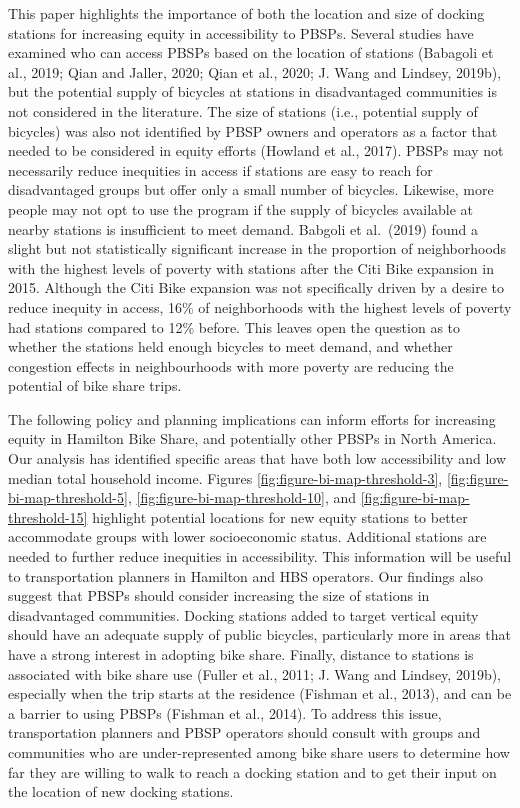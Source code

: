 \documentclass[]{elsarticle} %
\begin{document}
This paper highlights the importance of both the location and size of
docking stations for increasing equity in accessibility to PBSPs.
Several studies have examined who can access PBSPs based on the location
of stations (Babagoli et al., 2019; Qian and Jaller, 2020; Qian et al.,
2020; J. Wang and Lindsey, 2019b), but the potential supply of bicycles
at stations in disadvantaged communities is not considered in the
literature. The size of stations (i.e., potential supply of bicycles)
was also not identified by PBSP owners and operators as a factor that
needed to be considered in equity efforts (Howland et al., 2017). PBSPs
may not necessarily reduce inequities in access if stations are easy to
reach for disadvantaged groups but offer only a small number of
bicycles. Likewise, more people may not opt to use the program if the
supply of bicycles available at nearby stations is insufficient to meet
demand. Babgoli et al.~(2019) found a slight but not statistically
significant increase in the proportion of neighborhoods with the highest
levels of poverty with stations after the Citi Bike expansion in 2015.
Although the Citi Bike expansion was not specifically driven by a desire
to reduce inequity in access, 16\% of neighborhoods with the highest
levels of poverty had stations compared to 12\% before. This leaves open
the question as to whether the stations held enough bicycles to meet
demand, and whether congestion effects in neighbourhoods with more
poverty are reducing the potential of bike share trips.

The following policy and planning implications can inform efforts for
increasing equity in Hamilton Bike Share, and potentially other PBSPs in
North America. Our analysis has identified specific areas that have both
low accessibility and low median total household income. Figures
\ref{fig:figure-bi-map-threshold-3},
\ref{fig:figure-bi-map-threshold-5},
\ref{fig:figure-bi-map-threshold-10}, and
\ref{fig:figure-bi-map-threshold-15} highlight potential locations for
new equity stations to better accommodate groups with lower
socioeconomic status. Additional stations are needed to further reduce
inequities in accessibility. This information will be useful to
transportation planners in Hamilton and HBS operators. Our findings also
suggest that PBSPs should consider increasing the size of stations in
disadvantaged communities. Docking stations added to target vertical
equity should have an adequate supply of public bicycles, particularly
more in areas that have a strong interest in adopting bike share.
Finally, distance to stations is associated with bike share use (Fuller
et al., 2011; J. Wang and Lindsey, 2019b), especially when the trip
starts at the residence (Fishman et al., 2013), and can be a barrier to
using PBSPs (Fishman et al., 2014). To address this issue,
transportation planners and PBSP operators should consult with groups
and communities who are under-represented among bike share users to
determine how far they are willing to walk to reach a docking station
and to get their input on the location of new docking stations.
\end{document}
